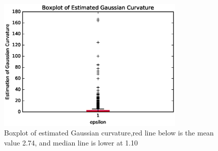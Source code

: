 \documentclass{article}
\begin{document}
\begin{figure}[htbp]
\centering
\includegraphics[width=0.8\textwidth]{Boxplot-size-4000-epsilon-15.eps}
\caption{Boxplot of estimated Gaussian curvature,red line below is the mean value 2.74, and median line is lower at 1.10}
\label{bp4000}
\end{figure}
\end{document}
